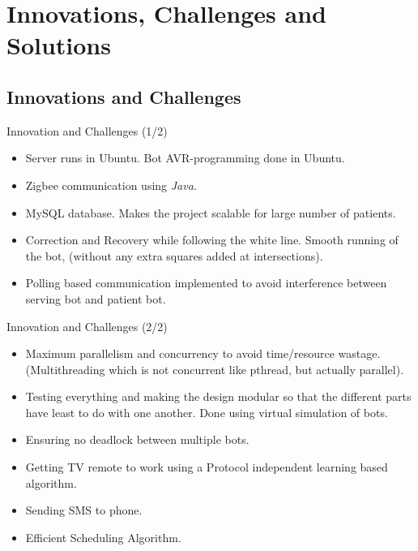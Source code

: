 \documentclass{beamer}
\begin{document}
\section{Innovations, Challenges and Solutions}
\subsection{Innovations and Challenges}
\begin{frame}{Innovation and Challenges (1/2)}
\begin{itemize}
\item Server runs in Ubuntu. Bot AVR-programming done in Ubuntu.
\item Zigbee communication using \emph{Java}.
\item MySQL database. Makes the project scalable for large number of patients.
\item Correction and Recovery while following the white line. Smooth running of the bot, (without any extra squares added at intersections).
\item Polling based communication implemented to avoid interference between serving bot and patient bot.
\end{itemize}
\end{frame}

\begin{frame}{Innovation and Challenges (2/2)}
\begin{itemize}
\item Maximum parallelism and concurrency to avoid time/resource wastage. (Multithreading which is not concurrent like pthread, but actually parallel).
\item Testing everything and making the design modular so that the different parts have least to do with one another. Done using virtual simulation of bots.
\item Ensuring no deadlock between multiple bots.
\item Getting TV remote to work using a Protocol independent learning based algorithm.
\item Sending SMS to phone.
\item Efficient Scheduling Algorithm.
\end{itemize}
\end{frame} 
\end{document}

